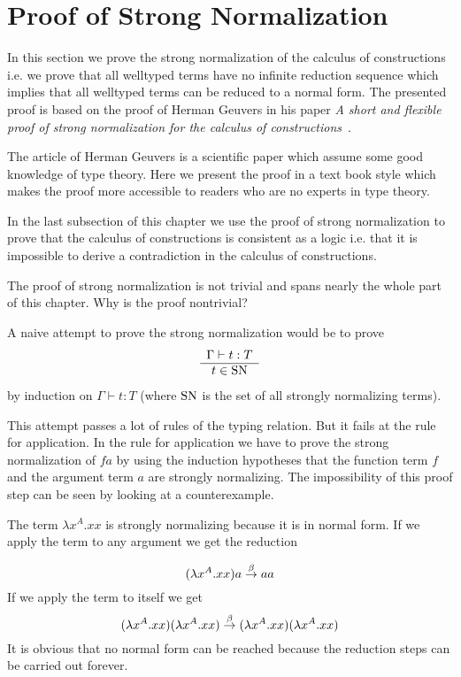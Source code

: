 \section{Proof of Strong Normalization}
\label{sec:NormalizationProof}

In this section we prove the strong normalization of the calculus of
constructions i.e. we prove that all welltyped terms have no infinite reduction
sequence which implies that all welltyped terms can be reduced to a normal
form. The presented proof is based on the proof of Herman Geuvers in his paper
\emph{A short and flexible proof of strong normalization for the calculus of
constructions}~\cite{geuvers1994}.

The article of Herman Geuvers is a scientific
paper which assume some good knowledge of type theory. Here we present the proof
in a text book style which makes the proof more accessible to readers who are
no experts in type theory.


In the last subsection of this chapter we use the proof of strong normalization
to prove that the calculus of constructions is consistent as a logic i.e. that
it is impossible to derive a contradiction in the calculus of constructions.

The proof of strong normalization is not trivial and spans nearly the whole part
of this chapter. Why is the proof nontrivial?

A naive attempt to prove the strong normalization would be to prove
$$
    \begin{array}{c} 
        \Gamma \vdash t : T
     \\ \hline  t \in \text{SN} \end{array}
$$
by induction on $\Gamma \vdash t : T$ (where $\text{SN}$ is the set of all strongly
normalizing terms).

This attempt passes a lot of rules of the typing relation. But it fails at the
rule for application. In the rule for application we have to prove the strong
normalization of $f a$ by using the induction hypotheses that the function term
$f$ and the argument term $a$ are strongly normalizing. The impossibility of
this proof step can be seen by looking at a counterexample.

The term $\lambda x^A. x x$ is strongly normalizing because it is in normal
form. If we apply the term to any argument we get the reduction

$$
    (\lambda x^A. x x) a \stackrel{\beta}{\to} a a
$$
%
If we apply the term to itself we get
%
$$
    (\lambda x^A. x x) (\lambda x^A. x x)
    \stackrel{\beta}{\to}
    (\lambda x^A. x x) (\lambda x^A. x x)
$$
%
It is obvious that no normal form can be reached because the reduction steps can
be carried out forever.

